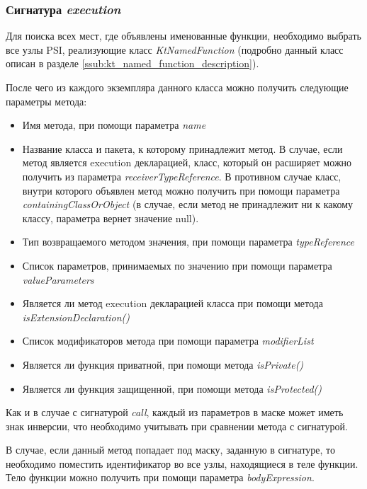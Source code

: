 \subsubsection{Сигнатура \textit{execution}}
\label{ssub:execution_signature}
Для поиска всех мест, где объявлены именованные функции, необходимо выбрать все
узлы PSI, реализующие класс \textit{KtNamedFunction} (подробно данный класс
описан в разделе \ref{ssub:kt_named_function_description}).

После чего из каждого экземпляра данного класса можно получить следующие параметры метода:
\begin{itemize}
	\item Имя метода, при помощи параметра \textit{name}
	\item Название класса и пакета, к которому принадлежит метод.
				В случае, если метод является execution декларацией, класс, который он
				расширяет можно получить из параметра \textit{receiverTypeReference}.
				В противном случае класс, внутри которого объявлен метод можно получить
				при	помощи параметра \textit{containingClassOrObject} (в случае, если
				метод не принадлежит ни к какому классу, параметра вернет значение null).
	\item Тип возвращаемого методом значения, при помощи параметра
				\textit{typeReference}
	\item Список параметров, принимаемых по значению при помощи параметра
				\textit{valueParameters}
	\item Является ли метод execution декларацией класса при помощи метода
				\textit{isExtensionDeclaration()}
	\item Список модификаторов метода при помощи параметра \textit{modifierList}
	\item Является ли функция приватной, при помощи метода \textit{isPrivate()}
	\item Является ли функция защищенной, при помощи метода \textit{isProtected()}
\end{itemize}

Как и в случае с сигнатурой \textit{call}, каждый из параметров в маске может
иметь знак инверсии, что необходимо учитывать при сравнении метода с сигнатурой.

В случае, если данный метод попадает под маску, заданную в сигнатуре, то
необходимо поместить идентификатор во все узлы, находящиеся в теле функции.
Тело функции можно получить при помощи параметра \textit{bodyExpression}.
